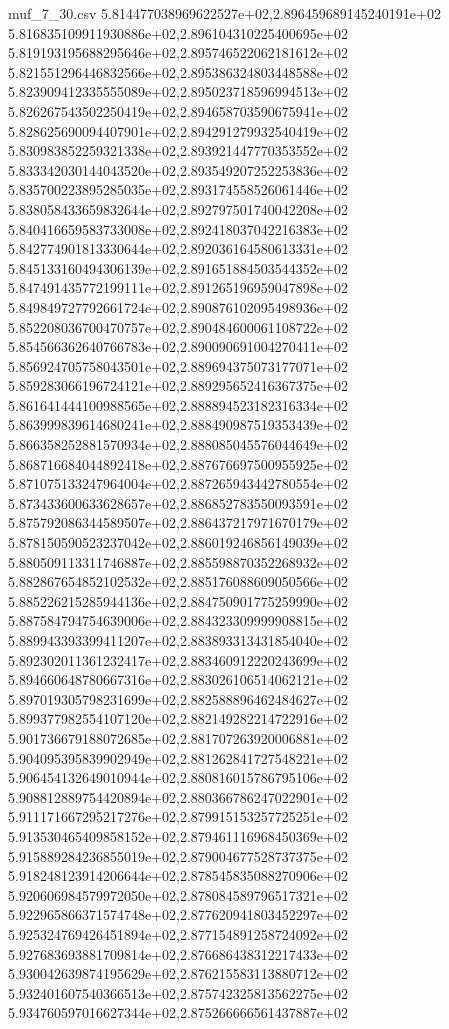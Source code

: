 \begin{filecontents*}{muf_7_30.csv}
5.814477038969622527e+02,2.896459689145240191e+02
5.816835109911930886e+02,2.896104310225400695e+02
5.819193195688295646e+02,2.895746522062181612e+02
5.821551296446832566e+02,2.895386324803448588e+02
5.823909412335555089e+02,2.895023718596994513e+02
5.826267543502250419e+02,2.894658703590675941e+02
5.828625690094407901e+02,2.894291279932540419e+02
5.830983852259321338e+02,2.893921447770353552e+02
5.833342030144043520e+02,2.893549207252253836e+02
5.835700223895285035e+02,2.893174558526061446e+02
5.838058433659832644e+02,2.892797501740042208e+02
5.840416659583733008e+02,2.892418037042216383e+02
5.842774901813330644e+02,2.892036164580613331e+02
5.845133160494306139e+02,2.891651884503544352e+02
5.847491435772199111e+02,2.891265196959047898e+02
5.849849727792661724e+02,2.890876102095498936e+02
5.852208036700470757e+02,2.890484600061108722e+02
5.854566362640766783e+02,2.890090691004270411e+02
5.856924705758043501e+02,2.889694375073177071e+02
5.859283066196724121e+02,2.889295652416367375e+02
5.861641444100988565e+02,2.888894523182316334e+02
5.863999839614680241e+02,2.888490987519353439e+02
5.866358252881570934e+02,2.888085045576044649e+02
5.868716684044892418e+02,2.887676697500955925e+02
5.871075133247964004e+02,2.887265943442780554e+02
5.873433600633628657e+02,2.886852783550093591e+02
5.875792086344589507e+02,2.886437217971670179e+02
5.878150590523237042e+02,2.886019246856149039e+02
5.880509113311746887e+02,2.885598870352268932e+02
5.882867654852102532e+02,2.885176088609050566e+02
5.885226215285944136e+02,2.884750901775259990e+02
5.887584794754639006e+02,2.884323309999908815e+02
5.889943393399411207e+02,2.883893313431854040e+02
5.892302011361232417e+02,2.883460912220243699e+02
5.894660648780667316e+02,2.883026106514062121e+02
5.897019305798231699e+02,2.882588896462484627e+02
5.899377982554107120e+02,2.882149282214722916e+02
5.901736679188072685e+02,2.881707263920006881e+02
5.904095395839902949e+02,2.881262841727548221e+02
5.906454132649010944e+02,2.880816015786795106e+02
5.908812889754420894e+02,2.880366786247022901e+02
5.911171667295217276e+02,2.879915153257725251e+02
5.913530465409858152e+02,2.879461116968450369e+02
5.915889284236855019e+02,2.879004677528737375e+02
5.918248123914206644e+02,2.878545835088270906e+02
5.920606984579972050e+02,2.878084589796517321e+02
5.922965866371574748e+02,2.877620941803452297e+02
5.925324769426451894e+02,2.877154891258724092e+02
5.927683693881709814e+02,2.876686438312217433e+02
5.930042639874195629e+02,2.876215583113880712e+02
5.932401607540366513e+02,2.875742325813562275e+02
5.934760597016627344e+02,2.875266666561437887e+02

\end{filecontents*}
